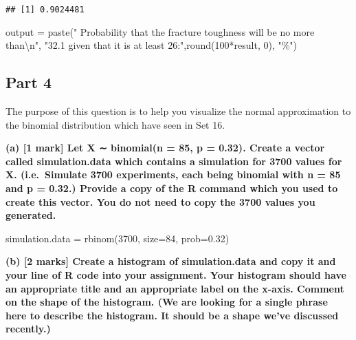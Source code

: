\documentclass[
]{article}
\newenvironment{Shaded}{\begin{snugshade}}{\end{snugshade}}
\newcommand{\AttributeTok}[1]{\textcolor[rgb]{0.77,0.63,0.00}{#1}}
\newcommand{\DecValTok}[1]{\textcolor[rgb]{0.00,0.00,0.81}{#1}}
\newcommand{\FloatTok}[1]{\textcolor[rgb]{0.00,0.00,0.81}{#1}}
\newcommand{\FunctionTok}[1]{\textcolor[rgb]{0.00,0.00,0.00}{#1}}
\newcommand{\NormalTok}[1]{#1}
\newcommand{\OtherTok}[1]{\textcolor[rgb]{0.56,0.35,0.01}{#1}}
\newcommand{\SpecialCharTok}[1]{\textcolor[rgb]{0.00,0.00,0.00}{#1}}
\newcommand{\StringTok}[1]{\textcolor[rgb]{0.31,0.60,0.02}{#1}}
\begin{document}
\begin{verbatim}
## [1] 0.9024481
\end{verbatim}

\begin{Shaded}
\begin{Highlighting}[]
\NormalTok{output }\OtherTok{=} \FunctionTok{paste}\NormalTok{(}\StringTok{" Probability that the fracture toughness will be no more than}\SpecialCharTok{\textbackslash{}n}\StringTok{"}\NormalTok{, }
               \StringTok{"32.1 given that it is at least 26:"}\NormalTok{,}\FunctionTok{round}\NormalTok{(}\DecValTok{100}\SpecialCharTok{*}\NormalTok{result, }\DecValTok{0}\NormalTok{), }\StringTok{"\%"}\NormalTok{)}
\end{Highlighting}
\end{Shaded}

\newpage

\hypertarget{part-4}{%
\subsection{Part 4}\label{part-4}}

The purpose of this question is to help you visualize the normal
approximation to the binomial distribution which have seen in Set 16.

\newline
\newline

\textbf{(a) {[}1 mark{]} Let X ∼ binomial(n = 85, p = 0.32). Create a
vector called simulation.data which contains a simulation for 3700
values for X. (i.e.~Simulate 3700 experiments, each being binomial with
n = 85 and p = 0.32.) Provide a copy of the R command which you used to
create this vector. You do not need to copy the 3700 values you
generated.}

\begin{Shaded}
\begin{Highlighting}[]
\NormalTok{simulation.data }\OtherTok{=} \FunctionTok{rbinom}\NormalTok{(}\DecValTok{3700}\NormalTok{, }\AttributeTok{size=}\DecValTok{84}\NormalTok{, }\AttributeTok{prob=}\FloatTok{0.32}\NormalTok{)}
\end{Highlighting}
\end{Shaded}

\newline
\newline

\textbf{(b) {[}2 marks{]} Create a histogram of simulation.data and copy
it and your line of R code into your assignment. Your histogram should
have an appropriate title and an appropriate label on the x-axis.
Comment on the shape of the histogram. (We are looking for a single
phrase here to describe the histogram. It should be a shape we've
discussed recently.)}
\end{document}
